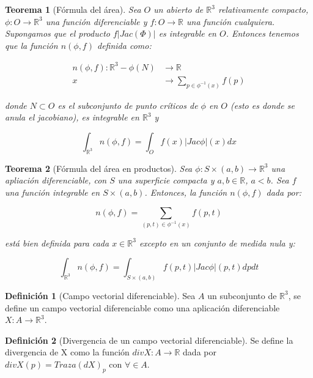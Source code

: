 \documentclass[paper=a4, fontsize=11pt, spanish]{scrartcl}
\newcommand{\rtres}{\mathbb{R}^3}
\newtheorem{theorem}{Teorema}[section]
\theoremstyle{definition}
\theoremstyle{definition}
\newtheorem{definition}{Definición}
\theoremstyle{definition}
\begin{document}
\begin{theorem}[Fórmula del área]
Sea $O$ un abierto de $\rtres$ relativamente compacto, $\phi: O \longrightarrow \rtres$ una función diferenciable y $f: O \longrightarrow \mathbb{R}$ una función cualquiera. Supongamos que el producto $f|Jac(\Phi)|$ es integrable en $O$. Entonces tenemos que la función $n(\phi, f)$ definida como:

\begin{align*}
    n(\phi, f): \rtres - \phi(N) &\longrightarrow \mathbb{R} \\
    x &\longrightarrow \sum_{p \in \phi^{-1}(x)} f(p)
\end{align*}

donde $N \subset O$ es el subconjunto de punto críticos de $\phi$ en $O$ (esto es donde se anula el jacobiano), es integrable en $\rtres$ y

\begin{equation*}
    \int_{\rtres} n(\phi, f) = \int_O f(x)|Jac \phi|(x)dx
\end{equation*}
\end{theorem}

\begin{theorem}[Fórmula del área en productos]
Sea $\phi: S \times (a,b) \longrightarrow \rtres$ una apliación diferenciable, con $S$ una superficie compacta y $a,b \in \mathbb{R}$, $a < b$. Sea $f$ una función integrable en $S \times (a,b)$. Entonces, la función $n(\phi, f)$ dada por:

\begin{equation*}
    n(\phi, f) = \sum_{(p,t) \in \phi^{-1}(x)} f(p,t)
\end{equation*}

está bien definida para cada $x \in \rtres$ excepto en un conjunto de medida nula y:

\begin{equation*}
    \int_{\rtres} n(\phi, f) = \int_{S \times (a,b)} f(p,t)|Jac \phi|(p,t)dpdt
\end{equation*}
\end{theorem}

\begin{definition}[Campo vectorial diferenciable]
Sea $A$ un subconjunto de $\rtres$, se define un campo vectorial diferenciable como una aplicación diferenciable $X: A \longrightarrow \rtres$.
\end{definition}

\begin{definition}[Divergencia de un campo vectorial diferenciable]
Se define la divergencia de X como la función $div X: A \longrightarrow \mathbb{R}$ dada por $divX(p) = Traza(dX)_p$ con $\forall \in A$.
\end{definition}
\end{document}
